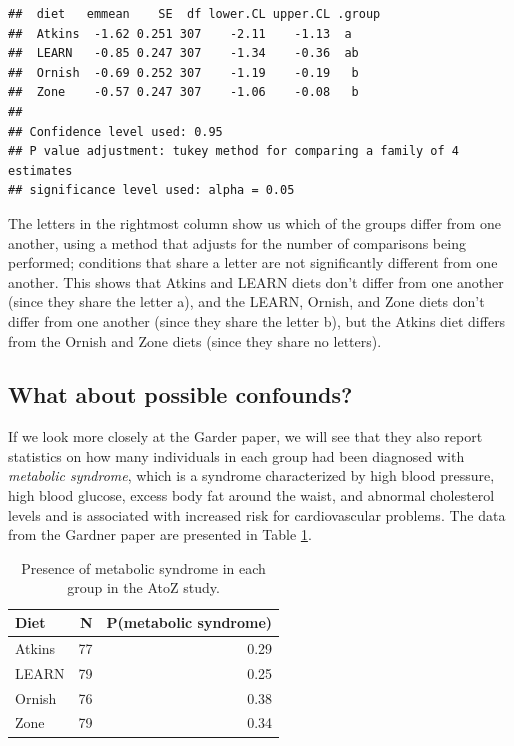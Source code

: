\documentclass[12pt,]{book}
\theoremstyle{definition}
\theoremstyle{definition}
\theoremstyle{definition}
\theoremstyle{remark}
\begin{document}
\begin{verbatim}
##  diet   emmean    SE  df lower.CL upper.CL .group
##  Atkins  -1.62 0.251 307    -2.11    -1.13  a    
##  LEARN   -0.85 0.247 307    -1.34    -0.36  ab   
##  Ornish  -0.69 0.252 307    -1.19    -0.19   b   
##  Zone    -0.57 0.247 307    -1.06    -0.08   b   
## 
## Confidence level used: 0.95 
## P value adjustment: tukey method for comparing a family of 4 estimates 
## significance level used: alpha = 0.05
\end{verbatim}

The letters in the rightmost column show us which of the groups differ from one another, using a method that adjusts for the number of comparisons being performed; conditions that share a letter are not significantly different from one another. This shows that Atkins and LEARN diets don't differ from one another (since they share the letter a), and the LEARN, Ornish, and Zone diets don't differ from one another (since they share the letter b), but the Atkins diet differs from the Ornish and Zone diets (since they share no letters).

\hypertarget{what-about-possible-confounds}{%
\subsection{What about possible confounds?}\label{what-about-possible-confounds}}

If we look more closely at the Garder paper, we will see that they also report statistics on how many individuals in each group had been diagnosed with \emph{metabolic syndrome}, which is a syndrome characterized by high blood pressure, high blood glucose, excess body fat around the waist, and abnormal cholesterol levels and is associated with increased risk for cardiovascular problems. The data from the Gardner paper are presented in Table \ref{tab:metsymData}.

\begin{table}

\caption{\label{tab:metsymData}Presence of metabolic syndrome in each group in the AtoZ study.}
\centering
\begin{tabular}[t]{l|r|r}
\hline
Diet & N & P(metabolic syndrome)\\
\hline
Atkins & 77 & 0.29\\
\hline
LEARN & 79 & 0.25\\
\hline
Ornish & 76 & 0.38\\
\hline
Zone & 79 & 0.34\\
\hline
\end{tabular}
\end{table}
\end{document}
